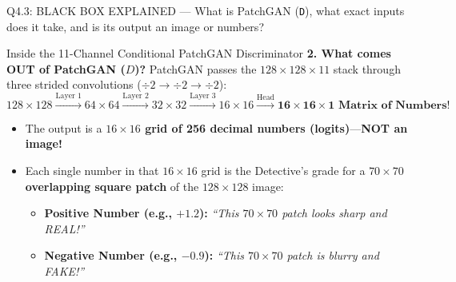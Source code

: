 \documentclass[11pt,a4paper]{article}
\begin{document}
\begin{qbox}{Q4.3: BLACK BOX EXPLAINED — What is PatchGAN (\texttt{D}), what exact inputs does it take, and is its output an image or numbers?}
\begin{blackbox}{Inside the 11-Channel Conditional PatchGAN Discriminator}
\textbf{2. What comes OUT of PatchGAN ($D$)?}
PatchGAN passes the $128\times 128\times 11$ stack through three strided convolutions ($\div 2 \to \div 2 \to \div 2$):
$$128\times 128 \xrightarrow{\text{Layer 1}} 64\times 64 \xrightarrow{\text{Layer 2}} 32\times 32 \xrightarrow{\text{Layer 3}} 16\times 16 \xrightarrow{\text{Head}} \mathbf{16\times 16\times 1\text{ Matrix of Numbers!}}$$
\begin{itemize}[leftmargin=18pt]
    \item The output is a \textbf{$16\times 16$ grid of 256 decimal numbers (logits)}—\textbf{NOT an image!}
    \item Each single number in that $16\times 16$ grid is the Detective's grade for a \textbf{$70\times 70$ overlapping square patch} of the $128\times 128$ image:
    \begin{itemize}
        \item \textbf{Positive Number (e.g., $+1.2$):} \textit{``This $70\times 70$ patch looks sharp and REAL!''}
        \item \textbf{Negative Number (e.g., $-0.9$):} \textit{``This $70\times 70$ patch is blurry and FAKE!''}
    \end{itemize}
\end{itemize}
\end{blackbox}
\end{qbox}
\end{document}
